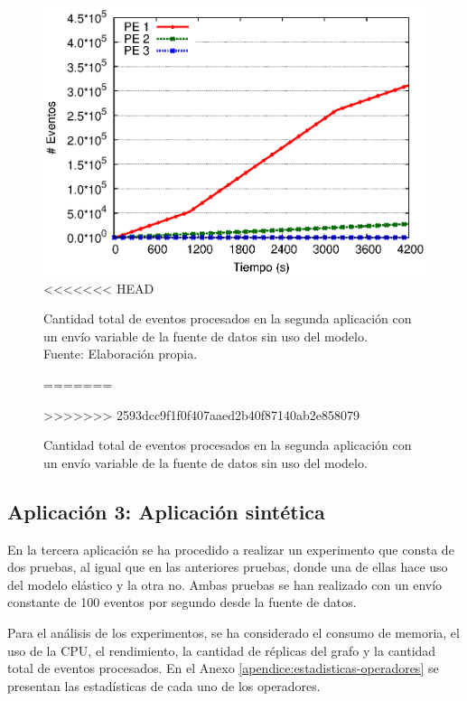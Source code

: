 \begin{figure}[!ht]
	\centering
	\captionsetup{justification=centering}
    \includegraphics[scale=0.7]{images/exp/app2/normal/sm/eventCount.eps}
<<<<<<< HEAD
    \caption[Cantidad total de eventos procesados en la segunda aplicación con un envío variable de la fuente de datos sin uso del modelo.]{Cantidad total de eventos procesados en la segunda aplicación con un envío variable de la fuente de datos sin uso del modelo.\\Fuente: Elaboración propia.}
=======
    \caption{Cantidad total de eventos procesados en la segunda aplicaci\'on con un env\'io variable de la fuente de datos sin uso del modelo.}
>>>>>>> 2593dcc9f1f0f407aaed2b40f87140ab2e858079
    \label{fig:app2-normal-eventCount-sm}
\end{figure}

\subsection{Aplicaci\'on 3: Aplicaci\'on sint\'etica}
En la tercera aplicaci\'on se ha procedido a realizar un experimento que consta de dos pruebas, al igual que en las anteriores pruebas, donde una de ellas hace uso del modelo el\'astico y la otra no. Ambas pruebas se han realizado con un env\'io constante de 100 eventos por segundo desde la fuente de datos.

Para el an\'alisis de los experimentos, se ha considerado el consumo de memoria, el uso de la CPU, \normalsize{el rendimiento, la cantidad de r\'eplicas del grafo} y la cantidad total de eventos procesados. En el Anexo \ref{apendice:estadisticas-operadores} \normalsize{se presentan las estad\'isticas de cada uno de los operadores.}

